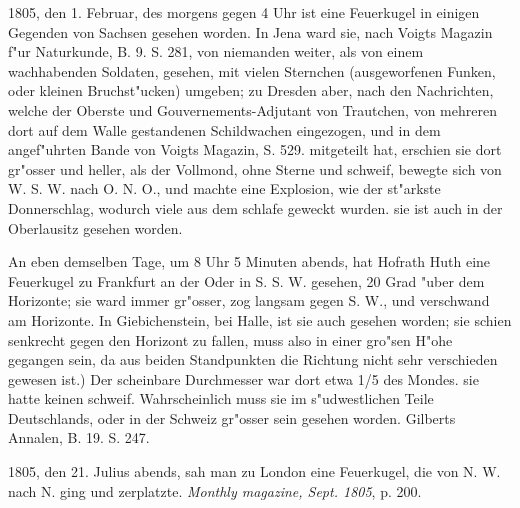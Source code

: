 \documentclass[a4paper, 11pt, oneside, polutonikogreek, german]{article}
\begin{document}
1805, den 1. Februar, des morgens gegen 4 Uhr ist eine Feuerkugel in einigen Gegenden von Sachsen gesehen worden. In Jena ward sie, nach Voigts Magazin f"ur Naturkunde, B. 9. S. 281, von niemanden weiter, als von einem wachhabenden Soldaten, gesehen, mit vielen Sternchen (ausgeworfenen Funken, oder kleinen Bruchst"ucken) umgeben; zu Dresden aber, nach den Nachrichten, welche der Oberste und Gouvernements-Adjutant von Trautchen, von mehreren dort auf dem Walle gestandenen Schildwachen eingezogen, und in dem angef"uhrten Bande von Voigts Magazin, S. 529. mitgeteilt hat, erschien sie dort gr"osser und heller, als der Vollmond, ohne Sterne und schweif, bewegte sich von W. S. W. nach O. N. O., und machte eine Explosion, wie der st"arkste Donnerschlag, wodurch viele aus dem schlafe geweckt wurden. sie ist auch in der Oberlausitz gesehen worden.

An eben demselben Tage, um 8 Uhr 5 Minuten abends, hat Hofrath Huth eine Feuerkugel zu Frankfurt an der Oder in S. S. W. gesehen, 20 Grad "uber dem Horizonte; sie ward immer gr"osser, zog langsam gegen S. W., und verschwand am Horizonte. In Giebichenstein, bei Halle, ist sie auch gesehen worden; sie schien senkrecht gegen den Horizont zu fallen, muss also in einer gro"sen H"ohe gegangen sein, da aus beiden Standpunkten die Richtung nicht sehr verschieden gewesen ist.) Der scheinbare Durchmesser war dort etwa 1/5 des Mondes. sie hatte keinen schweif. Wahrscheinlich muss sie im s"udwestlichen Teile Deutschlands, oder in der Schweiz gr"osser sein gesehen worden. Gilberts Annalen, B. 19. S. 247.

1805, den 21. Julius abends, sah man zu London eine Feuerkugel, die von N. W. nach N. ging und zerplatzte. \emph{Monthly magazine, Sept. 1805}, p. 200.
\end{document}
